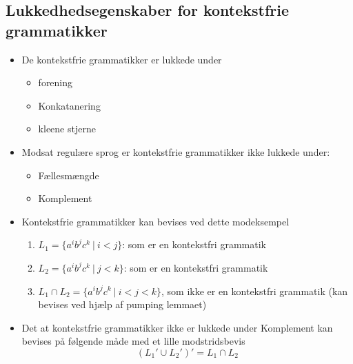 \documentclass[a4, danish]{article}
\begin{document}
\subsection{Lukkedhedsegenskaber for kontekstfrie grammatikker}
\begin{itemize}
  \item De kontekstfrie grammatikker er lukkede under 
  \begin{itemize}
    \item forening
    \item Konkatanering
    \item kleene stjerne
  \end{itemize}
  \item Modsat regulære sprog er kontekstfrie grammatikker ikke lukkede under:  
  \begin{itemize}
    \item Fællesmængde
    \item Komplement
  \end{itemize}
  \item Kontekstfrie grammatikker kan bevises ved dette modeksempel
    \begin{enumerate}
    	\item $L_1= \{a^ib^jc^k \ | \ i<j \}$: som er en kontekstfri grammatik
    	\item $L_2= \{a^ib^jc^k \ | \ j<k \}$: som er en kontekstfri grammatik
      \item $L_1 \cap L_2 = \{a^ib^jc^k \ | \ i<j<k \}$, som ikke er en kontekstfri grammatik (kan bevises ved hjælp af pumping lemmaet)
    \end{enumerate}
  \item Det at kontekstfrie grammatikker ikke er lukkede under Komplement kan bevises på følgende måde med et lille modstridsbevis
  \begin{equation*}
    (L_1' \cup L_2')' = L_1 \cap L_2
  \end{equation*}
\end{itemize}
\end{document}
